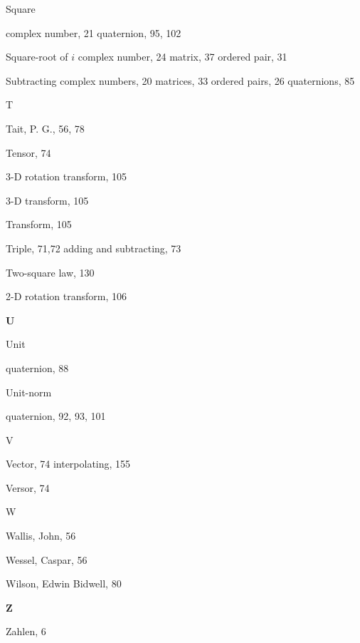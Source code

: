 \documentclass[10pt]{article}
\begin{document}
Square

complex number, 21 quaternion, 95, 102

Square-root of $i$ complex number, 24 matrix, 37 ordered pair, 31

Subtracting complex numbers, 20 matrices, 33 ordered pairs, 26 quaternions, 85

T

Tait, P. G., 56, 78

Tensor, 74

3-D rotation transform, 105

3-D transform, 105

Transform, 105

Triple, 71,72 adding and subtracting, 73

Two-square law, 130

2-D rotation transform, 106

$\mathbf{U}$

Unit

quaternion, 88

Unit-norm

quaternion, 92, 93, 101

V

Vector, 74 interpolating, 155

Versor, 74

W

Wallis, John, 56

Wessel, Caspar, 56

Wilson, Edwin Bidwell, 80

$\mathbf{Z}$

Zahlen, 6
\end{document}
